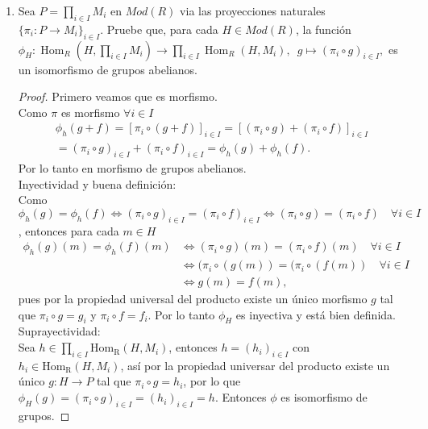\documentclass{article}
\begin{document}
\begin{enumerate}[label=\textbf{Ej \arabic*.}]
	

\item Sea $P=\displaystyle\prod_{i \in I}M_{i}$ en $Mod(R)$ via las proyecciones naturales \\$\{\pi_i\colon P\longrightarrow M_i\}_{i\in I}$. 
Pruebe que, para cada $H\in Mod(R)$, la función $\phi_H\colon \operatorname{Hom}_R(H,\displaystyle\prod_{i \in I}M_{i})
\longrightarrow \prod_{i \in I}\operatorname{Hom}_R(H,M_{i}),\,\,\,g\mapsto (\pi_i\circ g)_{i\in I},$ es un isomorfismo de grupos abelianos. 
\begin{proof}
Primero veamos que es morfismo.\\
Como $\pi$ es morfismo $\forall i\in I$
\begin{gather*}
\phi_h(g+f)=[\pi_i\circ (g+f)]_{i\in I}=[(\pi_i\circ g)+(\pi_i\circ f)]_{i\in I}\\
= (\pi_i\circ g)_{i\in I}+ (\pi_i\circ f)_{i\in I}=\phi_h(g)+\phi_h(f).
\end{gather*}
Por lo tanto en morfismo de grupos abelianos.\\

Inyectividad y buena definición:\\
Como $\phi_h(g)=\phi_h(f)\iff  (\pi_i\circ g)_{i\in I}= (\pi_i\circ f)_{i\in I}\iff  (\pi_i\circ g)= (\pi_i\circ f)\quad \forall i\in I$, entonces para 
cada $m \in H$ 
 \begin{align*}
 \phi_h(g)(m)=\phi_h(f)(m)&\iff (\pi_i\circ g)(m)= (\pi_i\circ f)(m)\quad \forall i\in I\\
 &\iff (\pi_i\circ (g(m))= (\pi_i\circ (f(m))\quad \forall i\in I\\
 &\iff g(m)=f(m), 
 \end{align*}
pues por la propiedad universal del producto existe un único morfismo $g$ tal que $\pi_i\circ g=g_i$ y $\pi_i\circ f=f_i$. Por lo tanto
$\phi_H$ es inyectiva y está bien definida.\\

Suprayectividad:\\
Sea $h\in \displaystyle\prod_{i\in I} \operatorname{Hom_R}(H,M_i)$, entonces $h=(h_i)_{i\in I}$ con $h_i\in \operatorname{Hom_R}(H,M_i)$,
así por la propiedad universar del producto existe un único $g\colon H\longrightarrow P$ tal que $\pi_i\circ g=h_i$, por lo que 
$\phi_H(g)=(\pi_i\circ g)_{i\in I}=(h_i)_{i\in I}=h$. Entonces $\phi$ es isomorfismo de grupos.



\end{proof}
\end{enumerate}
\end{document}
